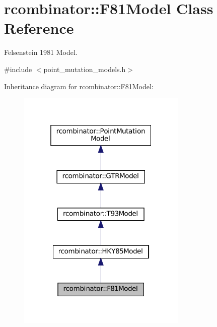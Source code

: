 \hypertarget{classrcombinator_1_1F81Model}{}\section{rcombinator\+:\+:F81\+Model Class Reference}
\label{classrcombinator_1_1F81Model}


Felsenstein 1981 Model.  




{\ttfamily \#include $<$point\+\_\+mutation\+\_\+models.\+h$>$}



Inheritance diagram for rcombinator\+:\+:F81\+Model\+:\nopagebreak
\begin{figure}[H]
\begin{center}
\leavevmode
\includegraphics[width=229pt]{classrcombinator_1_1F81Model__inherit__graph}
\end{center}
\end{figure}


